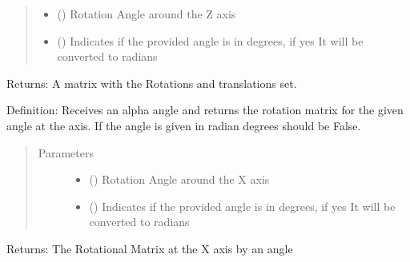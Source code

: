\documentclass[letterpaper,10pt,english]{sphinxmanual}
\begin{document}
\begin{fulllineitems}
\begin{quote}
\begin{description}
\begin{itemize}
\item {} 
 () \textendash{} Rotation Angle around the Z axis

\item {} 
 () \textendash{} Indicates if the provided angle is in degrees, if yes It will be converted to radians

\end{itemize}

\end{description}\end{quote}

Returns: A matrix with the Rotations and translations set.

\end{fulllineitems}


\begin{fulllineitems}
\label{\detokenize{rst/Example_6:Example_6.T_rot_x}}
Definition: Receives an alpha angle and returns the rotation matrix for the given angle at the  axis.
If the angle is given in radian degrees should be False.
\begin{quote}\begin{description}
\item[{Parameters}] \leavevmode\begin{itemize}
\item {} 
 () \textendash{} Rotation Angle around the X axis

\item {} 
 () \textendash{} Indicates if the provided angle is in degrees, if yes It will be converted to radians

\end{itemize}

\end{description}\end{quote}

Returns: The Rotational Matrix at the X axis by an  angle

\end{fulllineitems}
\end{document}
